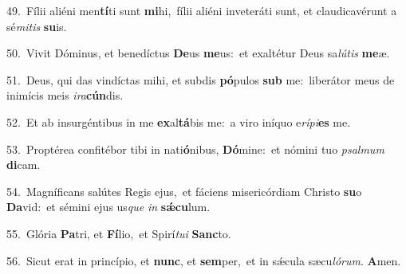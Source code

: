 {\numbfont\textcolor{\numbcolor}{49.}}~Fílii aliéni men\-\textbf{tí}\-ti sunt \textbf{mi}\-hi,~\star fílii aliéni inveteráti sunt, et claudicavérunt a sé\-\textit{mi}\-\textit{tis} \textbf{su}\-is.\par
{\numbfont\textcolor{\numbcolor}{50.}}~Vivit Dóminus, et benedíctus \textbf{De}\-us \textbf{me}\-us:~\star et exaltétur Deus sa\-\textit{lú}\-\textit{tis} \textbf{me}\-æ.\par
{\numbfont\textcolor{\numbcolor}{51.}}~Deus, qui das vindíctas mihi, et subdis \textbf{pó}\-pulos \textbf{sub} me:~\star liberátor meus de inimícis meis \textit{i}\-\textit{ra}\textbf{cún}dis.\par
{\numbfont\textcolor{\numbcolor}{52.}}~Et ab insurgéntibus in me \textbf{ex}\-al\-\textbf{tá}\-bis me:~\star a viro iníquo e\-\textit{rí}\-\textit{pi}\textbf{es} me.\par
{\numbfont\textcolor{\numbcolor}{53.}}~Proptérea confitébor tibi in nati\-\textbf{ó}\-nibus, \textbf{Dó}\-mine:~\star et nómini tuo \textit{psal}\-\textit{mum} \textbf{di}\-cam.\par
{\numbfont\textcolor{\numbcolor}{54.}}~Magníficans salútes Regis ejus,~\dagger et fáciens misericórdiam Christo \textbf{su}\-o \textbf{Da}\-vid:~\star et sémini ejus us\textit{que} \textit{in} \textbf{sǽ}\-\textbf{cu}lum.\par
{\numbfont\textcolor{\numbcolor}{55.}}~Glória \textbf{Pa}\-tri, et \textbf{Fí}\-lio,~\star et Spirí\-\textit{tu}\-\textit{i} \textbf{Sanc}\-to.\par
{\numbfont\textcolor{\numbcolor}{56.}}~Sicut erat in princípio, et \textbf{nunc}\-, et \textbf{sem}\-per,~\star et in sǽcula sæcu\-\textit{ló}\-\textit{rum}. \textbf{A}\-men.\par
